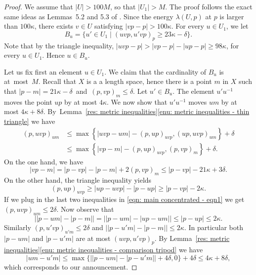 \documentclass[JEP,XML,SOM,Unicode, NoEqCountersInSection,published]{cedram}
\theoremstyle{plain}
\theoremstyle{definition}
\begin{document}
\begin{proof}
We assume that $|U| > 100M$, so that $|U_1| > M$.
The proof follows the exact same ideas as Lemmas~5.2 and 5.3 of \cite{delzant_product_2020}.
Since the energy $\lambda(U,p)$ at $p$ is larger than $100\kappa$, there exists $v \in U$ satisfying $|vp - p| > 100\kappa$.
For every $u \in U_1$, we let
\begin{equation*}
B_u =\{ u' \in U_1 \mid (uvp, u'vp)_p \geq 23\kappa - \delta\}.
\end{equation*}
Note that by the triangle inequality, $|uvp - p| > |vp - p| - |up - p| \geq 98\kappa$, for every $u \in U_1$.
Hence $u \in B_u$.

Let us fix first an element $u \in U_1$.
We claim that the cardinality of $B_u$ is at~most~$M$.
Recall that $X$ is a a length space, hence there is a point $m$ in $X$ such that \hbox{$|p - m | = 21\kappa - \delta$ and $(p,vp)_m \leq \delta$}.
Let $u' \in B_u$.
The element $u'u^{-1}$ moves the point $up$ by at most $4\kappa$.
We now show that $u'u^{-1}$ moves $um$ by at most $4\kappa + 8\delta$.
By~Lemma~\ref{res: metric inequalities}\eqref{enu: metric inequalities - thin triangle} we have
\begin{equation}
\begin{split}
(p, uvp)_{um}
& \leq \max\left\{|uvp - um| - (p,up)_{uvp}, (up,uvp)_{um}\right\} + \delta \\
& \leq \max\left\{|vp - m| - (p,up)_{uvp}, (p,vp)_{m}\right\} + \delta.
\end{split}
\label{eqn: main concentrated - eqn1}
\end{equation}
On the one hand, we have
\begin{equation*}
|vp - m| = |p - vp| - |p - m| + 2 (p,vp)_m \leq |p - vp| - 21 \kappa + 3\delta.
\end{equation*}
On the other hand, the triangle inequality yields
\begin{equation*}
(p,up)_{uvp} \geq |up - uvp| - |p - up| \geq |p - vp| - 2\kappa.
\end{equation*}
If we plug in the last two inequalities in \eqref{eqn: main concentrated - eqn1} we get $(p, uvp)_{um} \leq 2 \delta$.
Now observe that
\begin{equation*}
\bigl||p-um| - |p - m| \bigr| = \bigl||p-um| - |up - um| \bigr| \leq |p- up| \leq 2\kappa.
\end{equation*}
Similarly $(p, u'vp)_{u'm} \leq 2 \delta$ and $\bigl||p-u'm| - |p - m| \bigr| \leq 2\kappa$.
In particular both $|p - um|$ and $|p - u'm|$ are at most $(uvp,u'vp)_p$.
By Lemma~\ref{res: metric inequalities}\eqref{enu: metric inequalities - comparison tripod} we have
\begin{equation*}
|um - u'm| \leq \max \bigl\{ \bigl||p-um| - |p - u'm| \bigr| + 4 \delta, 0 \bigr\}+ 4\delta
\leq 4\kappa + 8\delta,
\end{equation*}
which corresponds to our announcement.


\end{proof}
\end{document}
